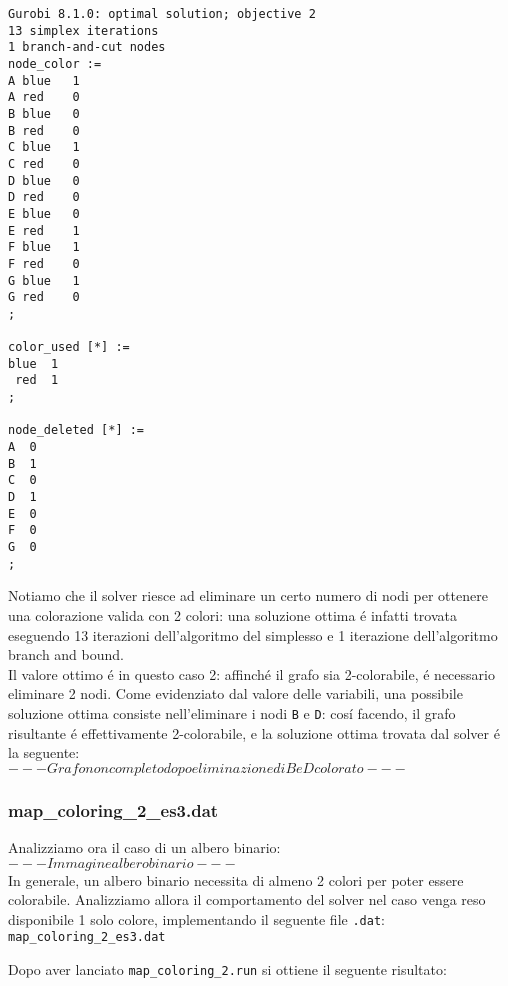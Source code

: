\documentclass{article}
\begin{document}
\begin{verbatim}
Gurobi 8.1.0: optimal solution; objective 2
13 simplex iterations
1 branch-and-cut nodes
node_color :=
A blue   1
A red    0
B blue   0
B red    0
C blue   1
C red    0
D blue   0
D red    0
E blue   0
E red    1
F blue   1
F red    0
G blue   1
G red    0
;

color_used [*] :=
blue  1
 red  1
;

node_deleted [*] :=
A  0
B  1
C  0
D  1
E  0
F  0
G  0
;

\end{verbatim}

Notiamo che il solver riesce ad eliminare un certo numero di nodi per ottenere una colorazione valida con 2 colori: una soluzione ottima \'e infatti trovata eseguendo 13 iterazioni dell'algoritmo del simplesso e 1 iterazione dell'algoritmo branch and bound.\\
Il valore ottimo \'e in questo caso 2: affinch\'e il grafo sia 2-colorabile, \'e necessario eliminare 2 nodi. Come evidenziato dal valore delle variabili, una possibile soluzione ottima consiste nell'eliminare i nodi \texttt{B} e \texttt{D}: cos\'i facendo, il grafo risultante \'e effettivamente 2-colorabile, e la soluzione ottima trovata dal solver \'e la seguente:\\

$ --- Grafo non completo dopo eliminazione di B e D colorato --- $

\pagebreak

\subsubsection{map\_coloring\_2\_es3.dat}
Analizziamo ora il caso di un albero binario:\\

$ --- Immagine albero binario --- $\\

In generale, un albero binario necessita di almeno 2 colori per poter essere colorabile. Analizziamo allora il comportamento del solver nel caso venga reso disponibile 1 solo colore, implementando il seguente file \texttt{.dat}:\\

\vspace{5mm}
\texttt{map\_coloring\_2\_es3.dat}

\vspace{5mm}

Dopo aver lanciato \texttt{map\_coloring\_2.run} si ottiene il seguente risultato:\\
\end{document}
